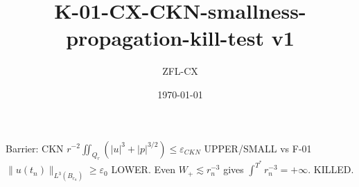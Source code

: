 \documentclass[11pt]{article}
\begin{document}
\title{K-01-CX-CKN-smallness-propagation-kill-test v1}\author{ZFL-CX}\date{\today}\maketitle
Barrier: CKN $\boxed{r^{-2}\iint_{Q_r}(|u|^3+|p|^{3/2})\le\varepsilon_{CKN}}$ UPPER/SMALL vs F-01 $\boxed{\|u(t_n)\|_{L^3(B_{r_n})}\ge\varepsilon_0}$ LOWER. Even $W_+\lesssim r_n^{-3}$ gives $\int^{T^*}r_n^{-3}=+\infty$. KILLED.
\end{document}
